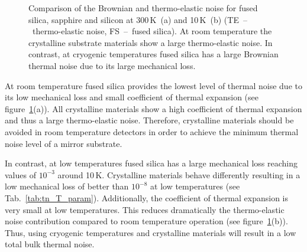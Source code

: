 \begin{figure}
\begin{center}
\end{center}
\caption{Comparison of the Brownian and thermo-elastic noise for fused silica, sapphire and silicon at 300\,K~(a) and 10\,K~(b) (TE~--~thermo-elastic noise, FS~--~fused silica). At room temperature the crystalline substrate materials show a large thermo-elastic noise. In contrast, at cryogenic temperatures fused silica has a large Brownian thermal noise due to its large mechanical loss.}
\label{fig:bulk_TN}
\end{figure}

At room temperature fused silica provides the lowest level of thermal noise due to its low mechanical loss and small coefficient of thermal expansion (see figure~\ref{fig:bulk_TN}(a)). All crystalline materials show a high coefficient of thermal expansion and thus a large thermo-elastic noise. Therefore, crystalline materials should be avoided in room temperature detectors in order to achieve the minimum thermal noise level of a mirror substrate.

In contrast, at low temperatures fused silica has a large mechanical loss reaching values of $10^{-3}$ around 10\,K. Crystalline materials behave differently resulting in a low mechanical loss of better than $10^{-8}$ at low temperatures (see Tab.~\ref{tab:tn_T_param}). Additionally, the coefficient of thermal expansion is very small at low temperatures. This reduces dramatically the thermo-elastic noise contribution compared to room temperature operation (see figure~\ref{fig:bulk_TN}(b)). Thus, using cryogenic temperatures and crystalline materials will result in a low total bulk thermal noise.

